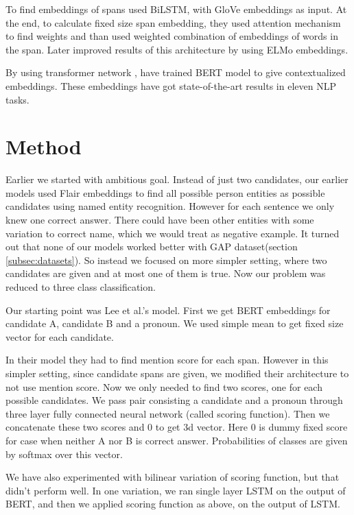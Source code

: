 \documentclass[11pt,a4paper]{article}
\begin{document}
To find embeddings of spans \citet{lee2017end} used BiLSTM, with GloVe \cite{pennington2014glove} embeddings as input. At the end, to calculate fixed size span embedding, they used attention mechanism to find weights and than used weighted combination of embeddings of words in the span. Later \citet{Peters:2018} improved results of this architecture by using ELMo embeddings.

By using transformer network \cite{vaswani2017attention}, \citet{devlin2018bert} have trained BERT model to give contextualized embeddings. These embeddings have got state-of-the-art results in eleven NLP tasks.

\section{Method}
\label{sec:method}
Earlier we started with ambitious goal. Instead of just two candidates, our earlier models used Flair embeddings to find all possible person entities as possible candidates using named entity recognition. However for each sentence we only knew one correct answer. There could have been other entities with some variation to correct name, which we would treat as negative example. It turned out that none of our models worked better with GAP dataset(section \ref{subsec:datasets}). So instead we focused on more simpler setting, where two candidates are given and at most one of them is true. Now our problem was reduced to three class classification.

Our starting point was Lee et al.'s model. First we get BERT embeddings for candidate A, candidate B and a pronoun. We used simple mean to get fixed size vector for each candidate. 

In their model they had to find mention score for each span. However in this simpler setting, since candidate spans are given, we modified their architecture to not use mention score. Now we only needed to find two scores, one for each possible candidates.  We pass pair consisting a candidate and a pronoun through three layer fully connected neural network (called scoring function). Then we concatenate these two scores and $0$ to get 3d vector. Here $0$ is dummy fixed score for case when neither A nor B is correct answer. Probabilities of classes are given by softmax over this vector.

We have also experimented with bilinear variation of scoring function, but that didn't perform well. In one variation, we ran single layer LSTM on the output of BERT, and then we applied scoring function as above, on the output of LSTM.
\end{document}
